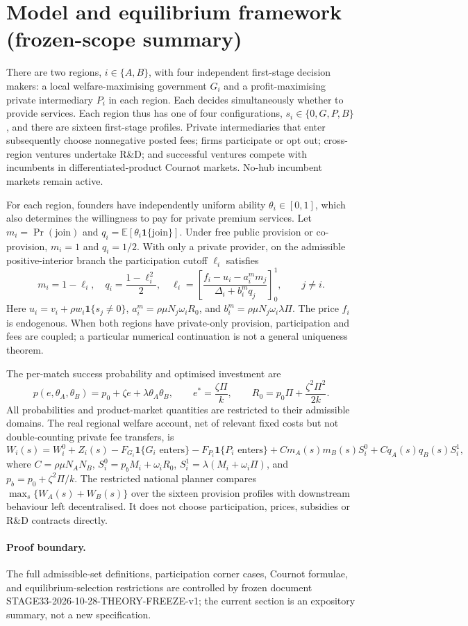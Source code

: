 \section{Model and equilibrium framework (frozen-scope summary)}
There are two regions, $i\in\{A,B\}$, with four independent first-stage decision makers: a local welfare-maximising government $G_i$ and a profit-maximising private intermediary $P_i$ in each region. Each decides simultaneously whether to provide services. Each region thus has one of four configurations, $s_i\in\{0,G,P,B\}$, and there are sixteen first-stage profiles. Private intermediaries that enter subsequently choose nonnegative posted fees; firms participate or opt out; cross-region ventures undertake R\&D; and successful ventures compete with incumbents in differentiated-product Cournot markets. No-hub incumbent markets remain active.

For each region, founders have independently uniform ability $\theta_i\in[0,1]$, which also determines the willingness to pay for private premium services. Let $m_i=\Pr(\mathrm{join})$ and $q_i=\mathbb{E}[\theta_i\mathbf 1\{\mathrm{join}\}]$. Under free public provision or co-provision, $m_i=1$ and $q_i=1/2$. With only a private provider, on the admissible positive-interior branch the participation cutoff $\ell_i$ satisfies
\begin{equation}
 m_i=1-\ell_i,\quad q_i=\frac{1-\ell_i^2}{2},\quad
 \ell_i=\left[\frac{f_i-u_i-a_i^m m_j}{\Delta_i+b_i^m q_j}\right]_0^1,
 \qquad j\ne i.
 \label{eq:sorting}
\end{equation}
Here $u_i=v_i+\rho w_i\mathbf1\{s_j\ne0\}$, $a_i^m=\rho\mu N_j\omega_i R_0$,
and $b_i^m=\rho\mu N_j\omega_i\lambda\Pi$. The price $f_i$ is endogenous. When both regions have private-only provision, participation and fees are coupled; a particular numerical continuation is not a general uniqueness theorem.

The per-match success probability and optimised investment are
\begin{equation}
 p(e,\theta_A,\theta_B)=p_0+\zeta e+\lambda\theta_A\theta_B,\qquad
 e^*=\frac{\zeta\Pi}{k},\qquad
 R_0=p_0\Pi+\frac{\zeta^2\Pi^2}{2k}.
\end{equation}
All probabilities and product-market quantities are restricted to their admissible domains. The real regional welfare account, net of relevant fixed costs but not double-counting private fee transfers, is
\begin{equation}
 W_i(s)=W_i^0+Z_i(s)-F_{G_i}\mathbf1\{G_i\text{ enters}\}
 -F_{P_i}\mathbf1\{P_i\text{ enters}\}
 +C m_A(s)m_B(s)S_i^0+C q_A(s)q_B(s)S_i^1,
 \label{eq:welfare}
\end{equation}
where $C=\rho\mu N_A N_B$, $S_i^0=p_bM_i+\omega_i R_0$,
$S_i^1=\lambda(M_i+\omega_i\Pi)$, and $p_b=p_0+\zeta^2\Pi/k$.
The restricted national planner compares $\max_s\{W_A(s)+W_B(s)\}$ over the sixteen provision profiles with downstream behaviour left decentralised. It does not choose participation, prices, subsidies or R\&D contracts directly.

\paragraph{Proof boundary.} The full admissible-set definitions, participation corner cases, Cournot formulae, and equilibrium-selection restrictions are controlled by frozen document STAGE33-2026-10-28-THEORY-FREEZE-v1; the current section is an expository summary, not a new specification.
